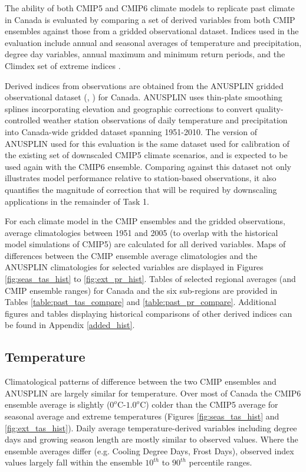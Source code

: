 \documentclass[]{scrartcl}
\begin{document}
The ability of both CMIP5 and CMIP6 climate models to replicate past climate in Canada is evaluated by comparing a set of derived variables from both CMIP ensembles against those from a gridded observational dataset. Indices used in the evaluation include annual and seasonal averages of temperature and precipitation, degree day variables, annual maximum and minimum return periods, and the Climdex set of extreme indices \citep{Zhang2011}. 

Derived indices from observations are obtained from the ANUSPLIN gridded observational dataset (\citealt{Hopkinson2012}, \citealt{McKenney2011}) for Canada. ANUSPLIN uses thin-plate smoothing splines incorporating elevation and geographic corrections to convert quality-controlled weather station observations of daily temperature and precipitation into Canada-wide gridded dataset spanning 1951-2010. The version of ANUSPLIN used for this evaluation is the same dataset used for calibration of the existing set of downscaled CMIP5 climate scenarios, and is expected to be used again with the CMIP6 ensemble. Comparing against this dataset not only illustrates model performance relative to station-based observations, it also quantifies the magnitude of correction that will be required by downscaling applications in the remainder of Task 1.

For each climate model in the CMIP ensembles and the gridded observations, average climatologies between 1951 and 2005 (to overlap with the historical model simulations of CMIP5) are calculated for all derived variables. Maps of differences between the CMIP ensemble average climatologies and the ANUSPLIN climatologies for selected variables are displayed in Figures \ref{fig:seas_tas_hist} to \ref{fig:ext_pr_hist}. Tables of selected regional averages (and CMIP ensemble ranges) for Canada and the six sub-regions are provided in Tables \ref{table:past_tas_compare} and \ref{table:past_pr_compare}. Additional figures and tables displaying historical comparisons of other derived indices can be found in Appendix \ref{added_hist}.


\subsection{Temperature}
Climatological patterns of difference between the two CMIP ensembles and ANUSPLIN are largely similar for temperature. Over most of Canada the CMIP6 ensemble average is slightly ($0^o$C-$1.0^o$C) colder than the CMIP5 average for seasonal average and extreme temperatures (Figures \ref{fig:seas_tas_hist} and \ref{fig:ext_tas_hist}). Daily average temperature-derived variables including degree days and growing season length are mostly similar to observed values. Where the ensemble averages differ (e.g. Cooling Degree Days, Frost Days), observed index values largely fall within the ensemble $10^{th}$ to $90^{th}$ percentile ranges. 
\end{document}

